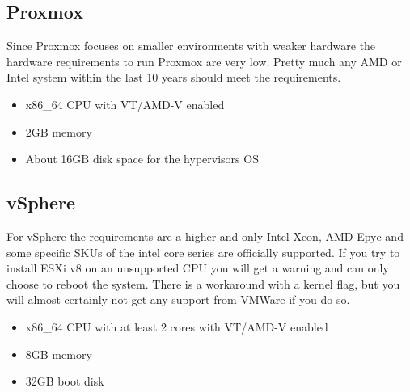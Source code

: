 \subsection{Proxmox}
Since Proxmox focuses on smaller environments with weaker hardware the hardware requirements to run Proxmox are very low. Pretty much any AMD or Intel system within the last 10 years should meet the requirements.

\begin{itemize}
	\item x86\_64 CPU with VT/AMD-V enabled
	\item 2GB memory
	\item About 16GB disk space for the hypervisors OS
\end{itemize}

\subsection{vSphere}
For vSphere the requirements are a higher and only Intel Xeon, AMD Epyc and some specific SKUs of the intel core series are officially supported. 
If you try to install ESXi v8 on an unsupported CPU you will get a warning and can only choose to reboot the system. There is a workaround with a kernel flag, but you will almost certainly not get any support from VMWare if you do so. 

\begin{itemize}
	\item x86\_64 CPU with at least 2 cores with VT/AMD-V enabled
	\item 8GB memory
	\item 32GB boot disk
\end{itemize}
